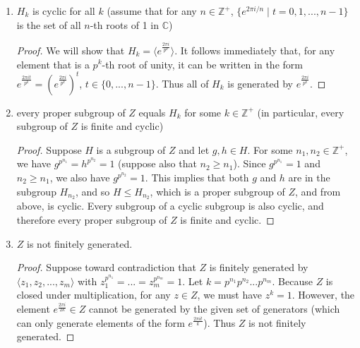 \documentclass{article}
\begin{document}
\begin{enumerate}[label=(\alph*), itemsep=0em]
\begin{proof}
            Next, let $H_k \leq H_m$ (to show that $k \leq m$). Now if we choose $h = e^{\frac{2 \pi i}{p^k}}$, then $h^{p^k} = (e^{\frac{2 \pi i}{p^k}})^{p^k} = e^{2 \pi i} = 1$. Also, $p^k$ is the smallest positive integer for which $h^{p^k} = 1$. Now $h \in H_k$, and by inclusion we also have $h \in H_m$, which implies that $h^m = 1$. Therefore $m$ must be no less than $k$, that is, $k \leq m$.
          \end{proof}
    \item $H_k$ is cyclic for all $k$ (assume that for any $n \in \mathbb{Z}^+$, $\{ e^{2 \pi i / n} \mid t = 0, 1, ..., n - 1 \}$ is the set of all $n$-th roots of 1 in $\mathbb{C}$)
          \begin{proof}
            We will show that $H_k = \langle e^{\frac{2 \pi i}{p^k}} \rangle$. It follows immediately that, for any element that is a $p^k$-th root of unity, it can be written in the form $e^{\frac{2 \pi i t}{p^k}} = (e^{\frac{2 \pi i}{p^k}})^t$, $t \in \{ 0, ..., n - 1 \}$. Thus all of $H_k$ is generated by $e^{\frac{2 \pi i}{p^k}}$.
          \end{proof}
    \item every proper subgroup of $Z$ equals $H_k$ for some $k \in \mathbb{Z}^+$ (in particular, every subgroup of $Z$ is finite and cyclic)
          \begin{proof}
            Suppose $H$ is a subgroup of $Z$ and let $g, h \in H$. For some $n_1, n_2 \in \mathbb{Z}^+$, we have $g^{p^{n_1}} = h^{p^{n_2}} = 1$ (suppose also that $n_2 \geq n_1$). Since $g^{p^{n_1}} = 1$ and $n_2 \geq n_1$, we also have $g^{p^{n_2}} = 1$. This implies that both $g$ and $h$ are in the subgroup $H_{n_2}$, and so $H \leq H_{n_2}$, which is a proper subgroup of $Z$, and from above, is cyclic. Every subgroup of a cyclic subgroup is also cyclic, and therefore every proper subgroup of $Z$ is finite and cyclic.
          \end{proof}
    \item $Z$ is not finitely generated.
          \begin{proof}
            Suppose toward contradiction that $Z$ is finitely generated by \\ $\langle z_1, z_2, ..., z_m \rangle$ with $z_1^{p^{n_1}} = ... = z_m^{p^{n_m}} = 1$. Let $k = p^{n_1}p^{n_2}...p^{n_m}$. Because $Z$ is closed under multiplication, for any $z \in Z$, we must have $z^k = 1$. However, the element $e^{\frac{2 \pi i}{2k}} \in Z$ cannot be generated by the given set of generators (which can only generate elements of the form $e^{\frac{2 \pi i t}{k}}$). Thus $Z$ is not finitely generated.
          \end{proof}
\end{enumerate}
\end{document}
